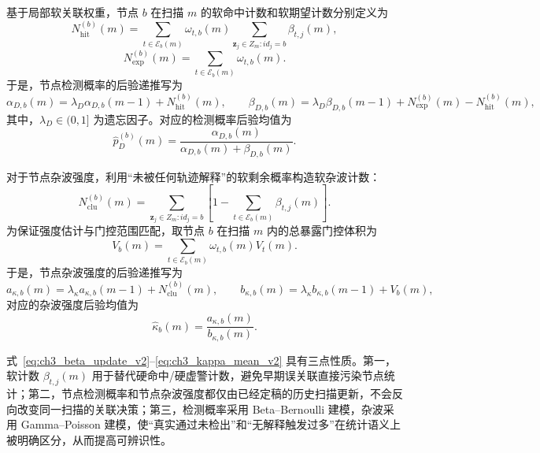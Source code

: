 \documentclass{xdupgthesis}
\begin{document}
基于局部软关联权重，节点 $b$ 在扫描 $m$ 的软命中计数和软期望计数分别定义为
\begin{equation}
	N_{\mathrm{hit}}^{(b)}(m)
	=
	\sum_{t\in\mathcal E_b(m)}
	\omega_{t,b}(m)
	\sum_{\mathbf z_j\in Z_m: id_j=b}
	\beta_{t,j}(m),
	\label{eq:ch3_soft_hit}
\end{equation}
\begin{equation}
	N_{\mathrm{exp}}^{(b)}(m)
	=
	\sum_{t\in\mathcal E_b(m)}\omega_{t,b}(m).
	\label{eq:ch3_soft_exp}
\end{equation}
于是，节点检测概率的后验递推写为
\begin{equation}
	\alpha_{D,b}(m)
	=
	\lambda_D\alpha_{D,b}(m-1)+N_{\mathrm{hit}}^{(b)}(m),
	\qquad
	\beta_{D,b}(m)
	=
	\lambda_D\beta_{D,b}(m-1)+N_{\mathrm{exp}}^{(b)}(m)-N_{\mathrm{hit}}^{(b)}(m),
	\label{eq:ch3_beta_update_v2}
\end{equation}
其中，$\lambda_D\in(0,1]$ 为遗忘因子。对应的检测概率后验均值为
\begin{equation}
	\hat p_D^{(b)}(m)=
	\frac{\alpha_{D,b}(m)}{\alpha_{D,b}(m)+\beta_{D,b}(m)}.
	\label{eq:ch3_pD_mean_v2}
\end{equation}

对于节点杂波强度，利用“未被任何轨迹解释”的软剩余概率构造软杂波计数：
\begin{equation}
	N_{\mathrm{clu}}^{(b)}(m)
	=
	\sum_{\mathbf z_j\in Z_m:id_j=b}
	\left[
	1-\sum_{t\in\mathcal E_b(m)}\beta_{t,j}(m)
	\right].
	\label{eq:ch3_soft_clutter}
\end{equation}
为保证强度估计与门控范围匹配，取节点 $b$ 在扫描 $m$ 内的总暴露门控体积为
\begin{equation}
	V_b(m)
	=
	\sum_{t\in\mathcal E_b(m)}
	\omega_{t,b}(m)V_t(m).
	\label{eq:ch3_exposure_volume}
\end{equation}
于是，节点杂波强度的后验递推写为
\begin{equation}
	a_{\kappa,b}(m)
	=
	\lambda_{\kappa}a_{\kappa,b}(m-1)+N_{\mathrm{clu}}^{(b)}(m),
	\qquad
	b_{\kappa,b}(m)
	=
	\lambda_{\kappa}b_{\kappa,b}(m-1)+V_b(m),
	\label{eq:ch3_kappa_update}
\end{equation}
对应的杂波强度后验均值为
\begin{equation}
	\hat \kappa_b(m)=\frac{a_{\kappa,b}(m)}{b_{\kappa,b}(m)}.
	\label{eq:ch3_kappa_mean_v2}
\end{equation}

式~\eqref{eq:ch3_beta_update_v2}--\eqref{eq:ch3_kappa_mean_v2} 具有三点性质。第一，软计数 $\beta_{t,j}(m)$ 用于替代硬命中/硬虚警计数，避免早期误关联直接污染节点统计；第二，节点检测概率和节点杂波强度都仅由已经定稿的历史扫描更新，不会反向改变同一扫描的关联决策；第三，检测概率采用 Beta--Bernoulli 建模，杂波采用 Gamma--Poisson 建模，使“真实通过未检出”和“无解释触发过多”在统计语义上被明确区分，从而提高可辨识性。
\end{document}
